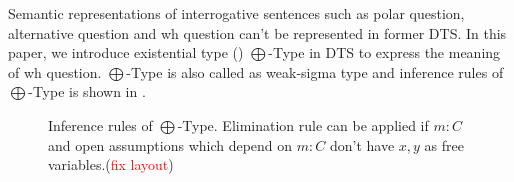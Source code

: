 \documentclass[a4paper,11pt, leqno]{article}
\begin{document}
Semantic representations of interrogative sentences such as polar question, alternative question and wh question can't be represented in former DTS. In this paper, we introduce existential type (\citet{Luo1994}) $\bigoplus$-Type in  DTS to express the meaning of wh question.  $\bigoplus$-Type is also called as weak-sigma type and inference rules of $\bigoplus$-Type is shown in .
\begin{figure}
\caption{Inference rules of $\bigoplus$-Type. Elimination rule can be applied if $m: C$ and open assumptions which depend on $m: C$ don't have $x, y$ as free variables.(\textcolor{red}{fix layout})}
    \label{fig:inference rules of existential type}
\end{figure}
\end{document}
